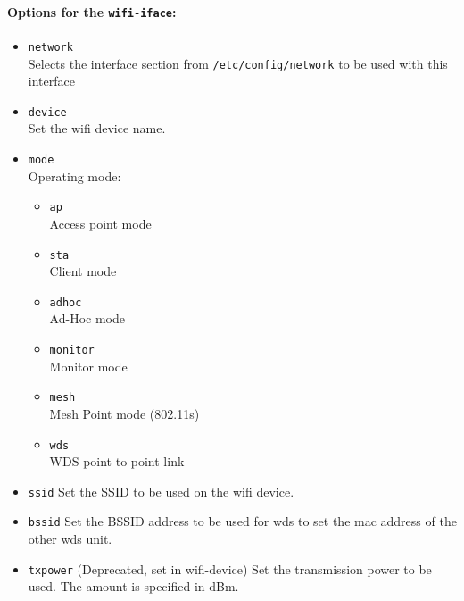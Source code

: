 \paragraph{Options for the \texttt{wifi-iface}:}

\begin{itemize}
    \item \texttt{network} \\
        Selects the interface section from \texttt{/etc/config/network} to be
        used with this interface

    \item \texttt{device} \\
	Set the wifi device name.

    \item \texttt{mode} \\
        Operating mode:

        \begin{itemize}
            \item \texttt{ap} \\
                Access point mode

            \item \texttt{sta} \\
                Client mode

            \item \texttt{adhoc} \\
                Ad-Hoc mode

            \item \texttt{monitor} \\
                Monitor mode

	    \item \texttt{mesh} \\
		Mesh Point mode (802.11s)

            \item \texttt{wds} \\
                WDS point-to-point link

        \end{itemize}

    \item \texttt{ssid}
	Set the SSID to be used on the wifi device.

    \item \texttt{bssid}
	Set the BSSID address to be used for wds to set the mac address of the other wds unit.

    \item \texttt{txpower}
	(Deprecated, set in wifi-device) Set the transmission power to be used. The amount is specified in dBm.


\end{itemize}
